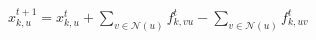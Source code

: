 
\color{ink}$\displaystyle
x^{t+1}_{k,u}=x^t_{k,u}+\sum_{v\in\mathcal N(u)}f^t_{k,vu}-\sum_{v\in\mathcal N(u)}f^t_{k,uv}
$
